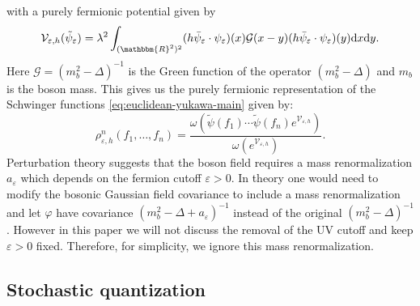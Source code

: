 \documentclass[11pt]{article}
\newcommand{\mathd}{\mathrm{d}}
\begin{document}
with a purely fermionic potential given by
\begin{equation}
  \mathcal{V}_{\varepsilon, h} (\tilde{\psi}_{\varepsilon}) = \lambda^2
  \int_{(\mathbbm{R}^2)^2} (h \bar{\psi}_{\varepsilon} \cdot
  \psi_{\varepsilon}) (x) \mathcal{G} (x - y) (h \bar{\psi}_{\varepsilon}
  \cdot \psi_{\varepsilon}) (y) \mathd x \mathd y. \label{eq:effectiveV}
\end{equation}
Here $\mathcal{G} = (m^2_b - \Delta)^{- 1}$ is the Green function of the
operator $(m^2_b - \Delta)$ and $m_b$ is the boson mass. This gives us the
purely fermionic representation of the Schwinger functions
{\eqref{eq:euclidean-yukawa-main}} given by:
\begin{equation}
  \rho^n_{\varepsilon, h} (f_1, \ldots, f_n) = \frac{\omega (\tilde{\psi}
  (f_1) \cdots \tilde{\psi} (f_n) e^{\mathcal{V}_{\varepsilon, h}})}{\omega
  (e^{\mathcal{V}_{\varepsilon, h}})} . \label{eq:euclidean-yukawa-fermion}
\end{equation}
Perturbation theory suggests that the boson field requires a mass
renormalization $a_{\varepsilon}$ which depends on the fermion cutoff
$\varepsilon > 0$. In theory one would need to modify the bosonic Gaussian
field covariance to include a mass renormalization and let $\varphi$ have
covariance $(m^2_b - \Delta + a_{\varepsilon})^{- 1}$ instead of the original
$(m^2_b - \Delta)^{- 1}$. However in this paper we will not discuss the
removal of the UV cutoff and keep $\varepsilon > 0$ fixed. Therefore, for
simplicity, we ignore this mass renormalization.

\subsection{Stochastic quantization}\label{sec:yukawa-sq}
\end{document}
